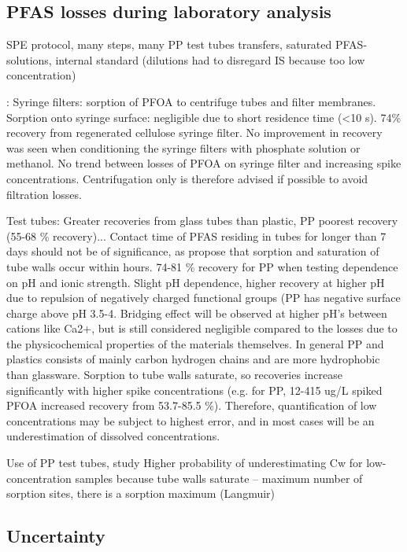 \subsection{PFAS losses during laboratory analysis}
SPE protocol, many steps, many PP test tubes transfers, saturated PFAS-solutions, internal standard (dilutions had to disregard IS because too low concentration)

\citep{Lath2019labsorb}: 
Syringe filters: sorption of PFOA to centrifuge tubes and filter membranes. Sorption onto syringe surface: negligible due to short residence time (\textless 10 s). 74\% recovery from regenerated cellulose syringe filter. No improvement in recovery was seen when conditioning the syringe filters with phosphate solution or methanol. No trend between losses of PFOA on syringe filter and increasing spike concentrations. Centrifugation only is therefore advised if possible to avoid filtration losses. 

Test tubes: Greater recoveries from glass tubes than plastic, PP poorest recovery (55-68 \% recovery)... Contact time of PFAS residing in tubes for longer than 7 days should not be of significance, as \citep{Lath2019labsorb} propose that sorption and saturation of tube walls occur within hours. 74-81 \% recovery for PP when testing dependence on pH and ionic strength. Slight pH dependence, higher recovery at higher pH due to repulsion of negatively charged functional groups (PP has negative surface charge above pH 3.5-4. Bridging effect will be observed at higher pH's between cations like Ca2+, but is still considered negligible compared to the losses due to the physicochemical properties of the materials themselves. In general PP and plastics consists of mainly carbon hydrogen chains and are more hydrophobic than glassware. Sorption to tube walls saturate, so recoveries increase significantly with higher spike concentrations (e.g. for PP, 12-415 ug/L spiked PFOA increased recovery from 53.7-85.5 \%). Therefore, quantification of low concentrations may be subject to highest error, and in most cases will be an underestimation of dissolved concentrations. 

Use of PP test tubes, study
Higher probability of underestimating Cw for low-concentration samples because tube walls saturate – maximum number of sorption sites, there is a sorption maximum (Langmuir)

\subsection{Uncertainty}
